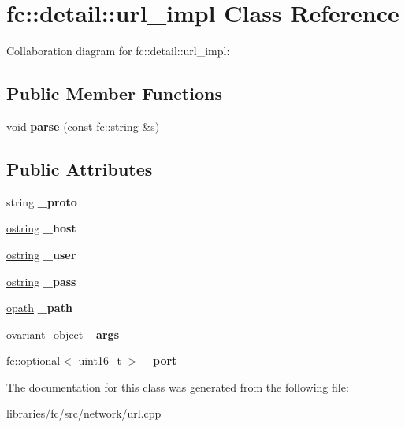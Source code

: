 \hypertarget{classfc_1_1detail_1_1url__impl}{}\section{fc\+:\+:detail\+:\+:url\+\_\+impl Class Reference}
\label{classfc_1_1detail_1_1url__impl}


Collaboration diagram for fc\+:\+:detail\+:\+:url\+\_\+impl\+:
\subsection*{Public Member Functions}
\begin{DoxyCompactItemize}
\item 
\mbox{\label{classfc_1_1detail_1_1url__impl_a0ed4bcf63521e25aaa66f34fb527a28f}} 
void {\bfseries parse} (const fc\+::string \&s)
\end{DoxyCompactItemize}
\subsection*{Public Attributes}
\begin{DoxyCompactItemize}
\item 
\mbox{\label{classfc_1_1detail_1_1url__impl_a2a9017b7b0ff4e16ce586d66bf0da10f}} 
string {\bfseries \+\_\+proto}
\item 
\mbox{\label{classfc_1_1detail_1_1url__impl_a7bb9afe8a57aee7f05bc4c99bf92df6d}} 
\mbox{\hyperlink{classfc_1_1optional}{ostring}} {\bfseries \+\_\+host}
\item 
\mbox{\label{classfc_1_1detail_1_1url__impl_aa2d5d415d73e71ce6043052eb9ec466a}} 
\mbox{\hyperlink{classfc_1_1optional}{ostring}} {\bfseries \+\_\+user}
\item 
\mbox{\label{classfc_1_1detail_1_1url__impl_a3e6148093136ca32bb025d77b4787eb4}} 
\mbox{\hyperlink{classfc_1_1optional}{ostring}} {\bfseries \+\_\+pass}
\item 
\mbox{\label{classfc_1_1detail_1_1url__impl_acde0bf9eeff2a6a485cc4de69d19fa64}} 
\mbox{\hyperlink{classfc_1_1optional}{opath}} {\bfseries \+\_\+path}
\item 
\mbox{\label{classfc_1_1detail_1_1url__impl_a9f89420dc16583539217535fb9ac2fc8}} 
\mbox{\hyperlink{classfc_1_1optional}{ovariant\+\_\+object}} {\bfseries \+\_\+args}
\item 
\mbox{\label{classfc_1_1detail_1_1url__impl_a1fc16b8f20a07ddc42799a1fcee58eb7}} 
\mbox{\hyperlink{classfc_1_1optional}{fc\+::optional}}$<$ uint16\+\_\+t $>$ {\bfseries \+\_\+port}
\end{DoxyCompactItemize}


The documentation for this class was generated from the following file\+:\begin{DoxyCompactItemize}
\item 
libraries/fc/src/network/url.\+cpp\end{DoxyCompactItemize}
